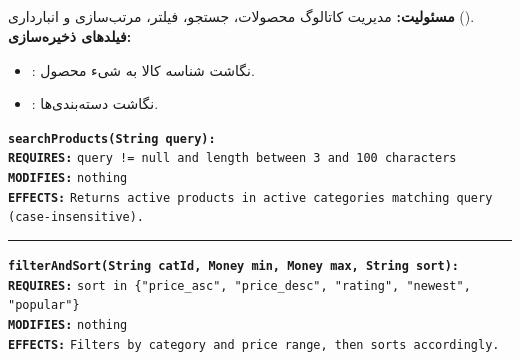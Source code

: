 \documentclass[11pt,a4paper]{article}
\begin{document}
\subsection{}
\textbf{مسئولیت:} مدیریت کاتالوگ محصولات، جستجو، فیلتر، مرتب‌سازی و انبارداری ().\\
\textbf{فیلدهای ذخیره‌سازی:}
\begin{itemize}
    \item {}: نگاشت شناسه کالا به شیء محصول.
    \item {}: نگاشت دسته‌بندی‌ها.
\end{itemize}
\begin{contractbox}
\begin{latin}
\setlength{\parindent}{0pt}
\setlength{\parskip}{2pt}
\small
\textbf{\color{autnavy}\texttt{searchProducts(String query):}} \\
\hspace*{1.5em}\textbf{\color{darkred}\texttt{REQUIRES:}} \texttt{query != null and length between 3 and 100 characters} \\
\hspace*{1.5em}\textbf{\color{autblue}\texttt{MODIFIES:}} \texttt{nothing} \\
\hspace*{1.5em}\textbf{\color{autteal}\texttt{EFFECTS:}}  \texttt{Returns active products in active categories matching query (case-insensitive).}

\vspace{4pt}\hrule\vspace{4pt}

\textbf{\color{autnavy}\texttt{filterAndSort(String catId, Money min, Money max, String sort):}} \\
\hspace*{1.5em}\textbf{\color{darkred}\texttt{REQUIRES:}} \texttt{sort in \{"price\_asc", "price\_desc", "rating", "newest", "popular"\}} \\
\hspace*{1.5em}\textbf{\color{autblue}\texttt{MODIFIES:}} \texttt{nothing} \\
\hspace*{1.5em}\textbf{\color{autteal}\texttt{EFFECTS:}}  \texttt{Filters by category and price range, then sorts accordingly.}
\end{latin}
\end{contractbox}
\end{document}
